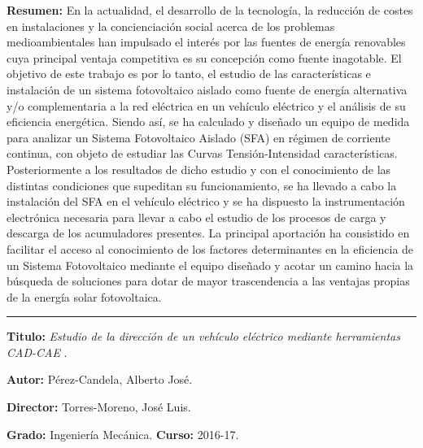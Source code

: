 \textbf{Resumen:} En la actualidad, el desarrollo de la tecnología, la reducción de costes en instalaciones y la concienciación social acerca de los problemas medioambientales han impulsado el interés por las fuentes de energía renovables cuya principal ventaja competitiva es su concepción como fuente inagotable. El objetivo de este trabajo es por lo tanto, el estudio de las características e instalación de un sistema fotovoltaico aislado como fuente de energía alternativa y/o complementaria a la red eléctrica en un vehículo eléctrico y el análisis de su eficiencia energética. Siendo así, se ha calculado y diseñado un equipo de medida para analizar un Sistema Fotovoltaico Aislado (SFA) en régimen de corriente continua, con objeto de estudiar las Curvas Tensión-Intensidad características. Posteriormente a los resultados de dicho estudio y con el conocimiento de las distintas condiciones que supeditan su funcionamiento, se ha llevado a cabo la instalación del SFA en el vehículo eléctrico y se ha dispuesto la instrumentación electrónica necesaria para llevar a cabo el estudio de los procesos de carga y descarga de los acumuladores presentes. La principal aportación ha consistido en facilitar el acceso al conocimiento de los factores determinantes en la eficiencia de un Sistema Fotovoltaico mediante el equipo diseñado y acotar un camino hacia la búsqueda de soluciones para dotar de mayor trascendencia a las ventajas propias de la energía solar fotovoltaica.
 
\vspace{6pt} \hrule \vspace{6pt}

\textbf{Titulo:} \textit{Estudio de la dirección de un vehículo eléctrico mediante herramientas CAD-CAE} \cite{perez2017CAD}.

\textbf{Autor:} Pérez-Candela, Alberto José.

\textbf{Director:} Torres-Moreno, José Luis.

\textbf{Grado:} Ingeniería Mecánica. \textbf{Curso:} 2016-17. 

 
